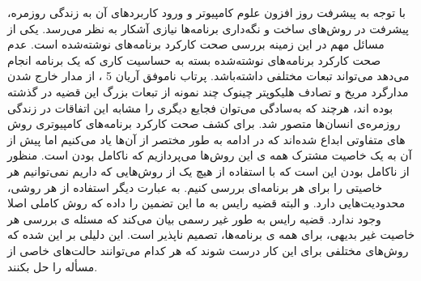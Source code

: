 \documentclass[12pt]{report}
\begin{document}
با توجه به پیشرفت روز‌ افزون علوم کامپیوتر و ورود کاربرد‌های آن به زندگی روزمره، پیشرفت در روش‌های ساخت و نگه‌داری برنامه‌ها نیازی آشکار به نظر می‌رسد. یکی از مسائل مهم در این زمینه بررسی صحت کارکرد برنامه‌های نوشته‌شده است. عدم صحت کارکرد برنامه‌های نوشته‌شده بسته به حساسیت کاری که یک برنامه انجام می‌دهد می‌تواند تبعات مختلفی داشته‌باشد. پرتاب ناموفق آریان 5\cite{ariane}  ، از مدار خارج شدن مدار‌گرد مریخ \cite{orbiter} و  تصادف هلیکوپتر چینوک \cite{chinook} چند نمونه از تبعات بزرگ این قضیه در گذشته بوده اند، هرچند که به‌سادگی می‌توان فجایع دیگری را مشابه این اتفاقات در زندگی روزمره‌ی انسان‌ها متصور شد.
برای کشف صحت کارکرد برنامه‌های کامپیوتری روش های متفاوتی ابداع شده‌اند که در ادامه به طور مختصر از آن‌ها یاد می‌کنیم اما پیش از آن به یک خاصیت مشترک همه ی این روش‌ها می‌پردازیم که ناکامل بودن است. منظور از ناکامل بودن این است که با استفاده از هیچ یک از روش‌هایی که داریم نمی‌توانیم هر خاصیتی را برای هر برنامه‌ای بررسی کنیم. به عبارت دیگر استفاده از هر روشی، محدودیت‌هایی دارد. و البته قضیه رایس  \cite{rice} به ما این تضمین را داده که روش کاملی اصلا وجود ندارد. قضیه رایس به طور غیر رسمی بیان می‌کند که مسئله ی بررسی هر خاصیت غیر بدیهی، برای همه ی برنامه‌ها، تصمیم ناپذیر است. این دلیلی بر این شده که روش‌های مختلفی برای این کار درست شوند که هر کدام می‌توانند حالت‌های خاصی از مسأله را حل بکنند.\\
\end{document}
